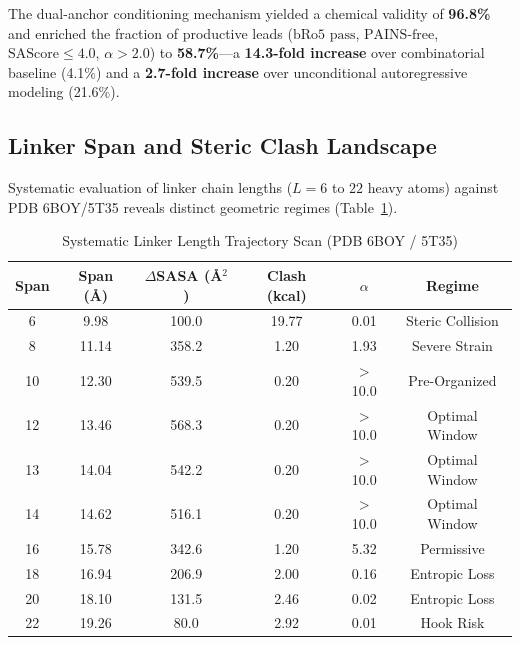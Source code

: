 \documentclass[conference]{IEEEtran}
\begin{document}
The dual-anchor conditioning mechanism yielded a chemical validity of \textbf{96.8\%} and enriched the fraction of productive leads ($\text{bRo5 pass}$, $\text{PAINS-free}$, $\text{SAScore} \le 4.0$, $\alpha > 2.0$) to \textbf{58.7\%}—a \textbf{14.3-fold increase} over combinatorial baseline (4.1\%) and a \textbf{2.7-fold increase} over unconditional autoregressive modeling (21.6\%).

\subsection{Linker Span and Steric Clash Landscape}
Systematic evaluation of linker chain lengths ($L = 6$ to $22$ heavy atoms) against PDB 6BOY/5T35 reveals distinct geometric regimes (Table~\ref{tab:length_scan}).

\begin{table}[htbp]
\caption{Systematic Linker Length Trajectory Scan (PDB 6BOY / 5T35)}
\begin{center}
\begin{tabular}{cccccc}
\toprule
\textbf{Span} & \textbf{Span (\AA)} & \textbf{$\Delta$SASA (\AA$^2$)} & \textbf{Clash (kcal)} & \textbf{$\alpha$} & \textbf{Regime} \\
\midrule
6  & 9.98  & 100.0 & 19.77 & 0.01   & Steric Collision \\
8  & 11.14 & 358.2 & 1.20  & 1.93   & Severe Strain \\
10 & 12.30 & 539.5 & 0.20  & $>$10.0& Pre-Organized \\
12 & 13.46 & 568.3 & 0.20  & $>$10.0& Optimal Window \\
13 & 14.04 & 542.2 & 0.20  & $>$10.0& Optimal Window \\
14 & 14.62 & 516.1 & 0.20  & $>$10.0& Optimal Window \\
16 & 15.78 & 342.6 & 1.20  & 5.32   & Permissive \\
18 & 16.94 & 206.9 & 2.00  & 0.16   & Entropic Loss \\
20 & 18.10 & 131.5 & 2.46  & 0.02   & Entropic Loss \\
22 & 19.26 & 80.0  & 2.92  & 0.01   & Hook Risk \\
\bottomrule
\end{tabular}
\label{tab:length_scan}
\end{center}
\end{table}
\end{document}
